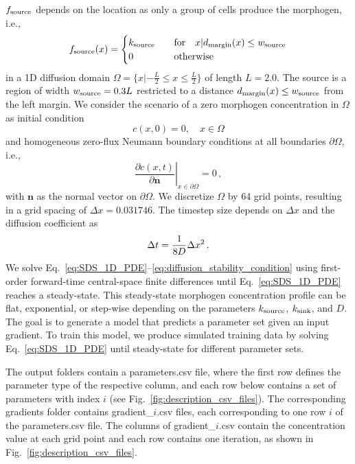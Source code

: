 \documentclass[11pt]{article}
\begin{document}
$f_{\rm{source}}$ depends on the location as only a group of cells produce the morphogen, i.e.,
\begin{equation}\label{eq:source}
	f_{\rm{source}}(x) =
        \begin{cases}
        k_{\rm{source}} \quad & \text{for} \quad x | d_{\rm{margin}}(x) \le w_{\rm{source}}  \\
        0 & \rm{otherwise}\, 
    \end{cases}  
\end{equation}
%
in a 1D diffusion domain $\Omega = \{x | -\frac{L}{2} \leq x \leq \frac{L}{2}\}$ of length $L=2.0$. The source is a region of width $w_{\rm{source}} = 0.3 L$ restricted to a distance $d_{\rm{margin}}(x) \le w_{\rm{source}}$ from the left margin. We consider the scenario of a zero morphogen concentration in $\Omega$ as initial condition
%
\begin{equation}\label{eq:IC}
	c(x,0) = 0, \quad x \in \Omega
\end{equation}
%
and homogeneous zero-flux Neumann boundary conditions at all boundaries $\partial \Omega$, i.e.,
%
\begin{equation}\label{eq:no_flux_BCs}
    \left. \frac{\partial c(x, t)}{\partial \bm n} \right\rvert_{x \in \partial \Omega} = 0\,,
\end{equation}
with $\bm n$ as the normal vector on $\partial \Omega$. We discretize $\Omega$ by 64 grid points, resulting in a grid spacing of $\Delta x=0.031746$. The timestep size depends on $\Delta x$ and the diffusion coefficient as
%
\begin{equation}{\label{eq:diffusion_stability_condition}}
    \Delta t = \frac{1}{8  D}  \Delta x^{2}\, .
\end{equation}
%
We solve Eq.~\eqref{eq:SDS_1D_PDE}--\eqref{eq:diffusion_stability_condition} using first-order forward-time central-space finite differences until Eq.~\eqref{eq:SDS_1D_PDE} reaches a steady-state. This steady-state morphogen concentration profile can be flat, exponential, or step-wise depending on the parameters $k_{\rm{source}}$, $k_{\rm{sink}}$, and $D$. The goal is to generate a model that predicts a parameter set given an input gradient. To train this model, we produce simulated training data by solving Eq.~\eqref{eq:SDS_1D_PDE} until steady-state for different parameter sets.

The output folders contain a parameters.csv file, where the first row defines the parameter type of the respective column, and each row below contains a set of parameters with index $i$ (see Fig.~\ref{fig:description_csv_files}). The corresponding gradients folder contains gradient\_$i$.csv files, each corresponding to one row $i$ of the parameters.csv file. The columns of gradient\_$i$.csv contain the concentration value at each grid point and each row contains one iteration, as shown in Fig.~\ref{fig:description_csv_files}.
\end{document}
